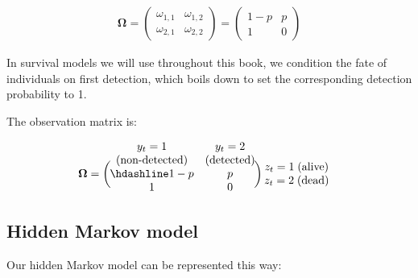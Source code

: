 \documentclass[
  12pt,
]{krantz}
\begin{document}
\begin{align*}
\mathbf{\Omega} =
\left(\begin{array}{cc}
\omega_{1,1} & \omega_{1,2}\\
\omega_{2,1} & \omega_{2,2}
\end{array}\right) =
\left(\begin{array}{cc}
1 - p & p\\
1 & 0
\end{array}\right)
\end{align*}

In survival models we will use throughout this book, we condition the fate of individuals on first detection, which boils down to set the corresponding detection probability to 1.

The observation matrix is:

\[\begin{matrix}
& \\
\mathbf{\Omega} =
    \left ( \vphantom{ \begin{matrix} 12 \\ 12 \end{matrix} } \right .
\end{matrix}
\hspace{-1.2em}
\begin{matrix}
    y_t=1 & y_t=2 \\
    \mbox{(non-detected)} & \mbox{(detected)} \\ \hdashline
1 - p & p\\
1 & 0\\
\end{matrix}
\hspace{-0.2em}
\begin{matrix}
& \\
\left . \vphantom{ \begin{matrix} 12 \\ 12 \end{matrix} } \right )
    \begin{matrix}
    z_{t}=1 \; \mbox{(alive)}\\ z_{t}=2 \; \mbox{(dead)}
    \end{matrix}
\end{matrix}\]

\subsection{Hidden Markov model}\label{hidden-markov-model}

Our hidden Markov model can be represented this way:
\end{document}
